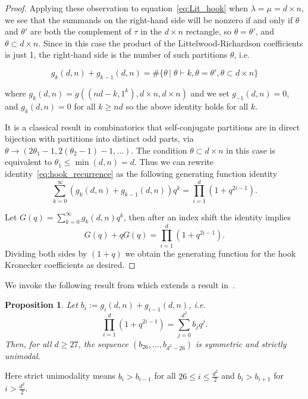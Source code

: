 \documentclass{article}
\numberwithin{equation}{section}
\newtheorem{proposition}[equation]{Proposition}
\theoremstyle{definition}
\begin{document}
\begin{proof}
Applying these observation to equation~\eqref{eq:Lit_hook} when $\lambda=\mu=d \times n$, we see that the summands on the right-hand side will be nonzero if and only if $\theta$ and $\theta'$ are both the complement of $\tau$ in the $d \times n$ rectangle, so $\theta=\theta'$, and $\theta \subset d \times n$. Since in this case the product of the Littelwood-Richardson coefficients is just 1, the right-hand side is the number of such partitions $\theta$, i.e. 

\begin{equation}\label{eq:hook_recurrence}
g_k(d,n) + g_{k-1}(d,n) = \# \{\theta \, | \; \theta \vdash k, \theta=\theta', \theta \subset d \times n\}
\end{equation}

where $g_k(d,n) = g( (nd -k, 1^k), d \times n, d \times n)$ and we set $g_{-1}(d,n) = 0$, and $g_{k}(d,n)=0$ for all $ k \geq nd$ so the above identity holds for all $k$. 

It is a classical result in combinatorics that self-conjugate partitions are in direct bijection with partitions into distinct odd parts, via $\theta \to ( 2\theta_1-1,2(\theta_2 -1) -1, \ldots)$. The condition $\theta \subset d \times n$ in this case is equivalent to $\theta_1 \leq \min(d,n)=d$. Thus we can rewrite identity~\eqref{eq:hook_recurrence} as the following generating function identity
\begin{equation}\label{eq:gen_fun}
\sum_{k=0}^{\infty} (g_k(d,n) + g_{k-1}(d,n)) q^k = \prod_{i=1}^d (1+q^{2i-1}). 
\end{equation}

Let $G(q) = \sum_{k=0}^{\infty} g_k(d,n)q^k$, then after an index shift the identity implies
$$G(q) +qG(q) = \prod_{i=1}^d (1+q^{2i-1}).$$
Dividing both sides by $(1+q)$ we obtain the generating function for the hook Kronecker coefficients as desired. 

\end{proof}


We invoke the following result from \cite{pp:14} which extends a result in~\cite{alm:85}.

\begin{proposition} Let $b_i := g_i(d,n) + g_{i-1}(d,n)$, i.e. 
$$
 \prod_{i=1}^d  (1+q^{2 i-1})  =  \sum_{j=0}^{d^2} b_j  q^j .
$$
Then, for all  $d\ge 27$, the sequence $(b_{26},\ldots,b_{d^2-26})$ is symmetric and strictly unimodal.
\end{proposition} 
Here strict unimodality means $b_i > b_{i-1}$ for all $26 \leq i \leq \frac{d^2}{2}$ and $b_{i} > b_{i+1}$ for $i >  \frac{d^2}{2}$. 
\end{document}
